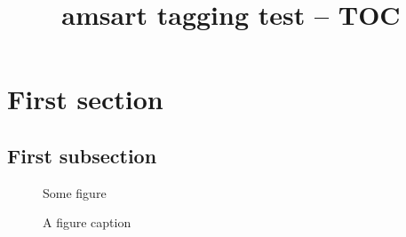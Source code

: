 \documentclass{amsart}
\title{amsart tagging test -- TOC}
\begin{document}
\tableofcontents
\listoffigures

\section{First section}
\subsection{First subsection}
\begin{figure}
Some figure
\caption{A figure caption}
\end{figure}
\end{document}
